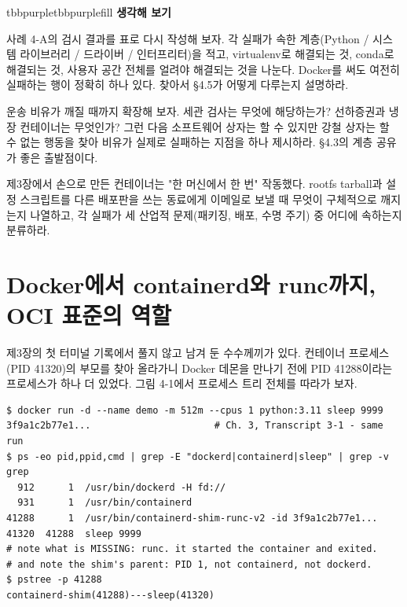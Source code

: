 \begin{calloutbox}{tbbpurple}{tbbpurplefill}
{\normalsize\bfseries\color{tbbpurple}생각해 보기}\par\vspace{3pt}
\begin{tbbitemize}
  \item 사례 4-A의 검시 결과를 표로 다시 작성해 보자. 각 실패가 속한 계층(Python / 시스템 라이브러리 / 드라이버 / 인터프리터)을 적고, virtualenv로 해결되는 것, conda로 해결되는 것, 사용자 공간 전체를 얼려야 해결되는 것을 나눈다. Docker를 써도 여전히 실패하는 행이 정확히 하나 있다. 찾아서 §4.5가 어떻게 다루는지 설명하라.
  \item 운송 비유가 깨질 때까지 확장해 보자. 세관 검사는 무엇에 해당하는가? 선하증권과 냉장 컨테이너는 무엇인가? 그런 다음 소프트웨어 상자는 할 수 있지만 강철 상자는 할 수 없는 행동을 찾아 비유가 실제로 실패하는 지점을 하나 제시하라. §4.3의 계층 공유가 좋은 출발점이다.
  \item 제3장에서 손으로 만든 컨테이너는 "한 머신에서 한 번" 작동했다. rootfs tarball과 설정 스크립트를 다른 배포판을 쓰는 동료에게 이메일로 보낼 때 무엇이 구체적으로 깨지는지 나열하고, 각 실패가 세 산업적 문제(패키징, 배포, 수명 주기) 중 어디에 속하는지 분류하라.
\end{tbbitemize}
\end{calloutbox}

\section{Docker에서 containerd와 runc까지, OCI 표준의 역할}

제3장의 첫 터미널 기록에서 풀지 않고 남겨 둔 수수께끼가 있다. 컨테이너 프로세스(PID 41320)의 부모를 찾아 올라가니 Docker 데몬을 만나기 전에 PID 41288이라는 프로세스가 하나 더 있었다. 그림 4-1에서 프로세스 트리 전체를 따라가 보자.

\begin{terminalbox}
\begin{Verbatim}[breaklines=true,breakanywhere=true,fontsize=\small,formatcom=\color{tbbtermfg},codes=\tbbcodeactive]
$ docker run -d --name demo -m 512m --cpus 1 python:3.11 sleep 9999
3f9a1c2b77e1...                      # Ch. 3, Transcript 3-1 - same run
$ ps -eo pid,ppid,cmd | grep -E "dockerd|containerd|sleep" | grep -v grep
  912      1  /usr/bin/dockerd -H fd://
  931      1  /usr/bin/containerd
41288      1  /usr/bin/containerd-shim-runc-v2 -id 3f9a1c2b77e1...
41320  41288  sleep 9999
# note what is MISSING: runc. it started the container and exited.
# and note the shim's parent: PID 1, not containerd, not dockerd.
$ pstree -p 41288
containerd-shim(41288)---sleep(41320)
\end{Verbatim}
\end{terminalbox}

